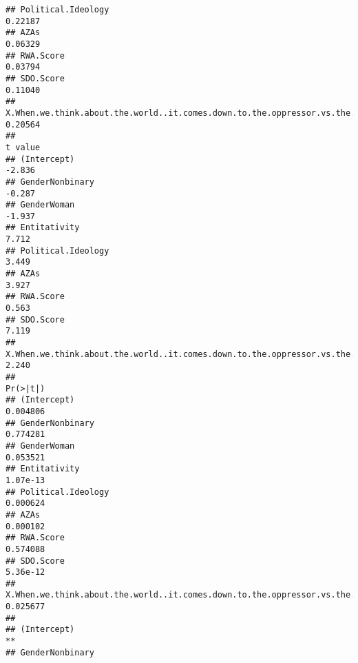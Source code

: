 \documentclass[
  doc,draftall]{apa6}
\begin{document}
\begin{verbatim}
## Political.Ideology                                                                    0.22187
## AZAs                                                                                  0.06329
## RWA.Score                                                                             0.03794
## SDO.Score                                                                             0.11040
## X.When.we.think.about.the.world..it.comes.down.to.the.oppressor.vs.the.oppressed..    0.20564
##                                                                                    t value
## (Intercept)                                                                         -2.836
## GenderNonbinary                                                                     -0.287
## GenderWoman                                                                         -1.937
## Entitativity                                                                         7.712
## Political.Ideology                                                                   3.449
## AZAs                                                                                 3.927
## RWA.Score                                                                            0.563
## SDO.Score                                                                            7.119
## X.When.we.think.about.the.world..it.comes.down.to.the.oppressor.vs.the.oppressed..   2.240
##                                                                                    Pr(>|t|)
## (Intercept)                                                                        0.004806
## GenderNonbinary                                                                    0.774281
## GenderWoman                                                                        0.053521
## Entitativity                                                                       1.07e-13
## Political.Ideology                                                                 0.000624
## AZAs                                                                               0.000102
## RWA.Score                                                                          0.574088
## SDO.Score                                                                          5.36e-12
## X.When.we.think.about.the.world..it.comes.down.to.the.oppressor.vs.the.oppressed.. 0.025677
##                                                                                       
## (Intercept)                                                                        ** 
## GenderNonbinary                                                                       

\end{verbatim}
\end{document}
